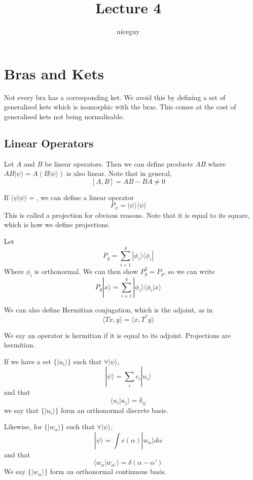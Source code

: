 \documentclass[12pt]{article}
\title{Lecture 4}
\author{niceguy}
\begin{document}
\maketitle

\section{Bras and Kets}

Not every bra has a corresponding ket. We avoid this by defining a set of generalised kets which is isomorphic with the bras. This comes at the cost of generalised kets not being normalisable.

\subsection{Linear Operators}

Let $A$ and $B$ be linear operators. Then we can define products $AB$ where $AB|\psi\rangle = A\left(B|\psi\rangle\right)$ is also linear. Note that in general,
$$[A,B] = AB - BA \neq 0$$

\begin{ex}
    If $\langle \psi | \psi \rangle =$, we can define a linear operator
    $$P_\psi = |\psi\rangle\langle\psi|$$
    This is called a projection for obvious reasons. Note that it is equal to its square, which is how we define projections.
\end{ex}

\begin{ex}
    Let
    $$P_g = \sum_{i=1}^g |\phi_i\rangle\langle\phi_i|$$
    Where $\phi_i$ is orthonormal. We can then show $P_g^2 = P_g$, so we can write
    $$P_g|x\rangle = \sum_{i=1}^g |\phi_i\rangle\langle\phi_i|x\rangle$$
\end{ex}

We can also define Hermitian conjugation, which is the adjoint, as in
$$\langle Tx,y \rangle = \langle x,T^*y \rangle$$

We say an operator is hermitian if it is equal to its adjoint. Projections are hermitian.

\begin{defn}
    If we have a set $\{|u_i\rangle\}$ such that $\forall |\psi\rangle$,
    $$|\psi\rangle = \sum_i c_i |u_i\rangle$$
    and that
    $$\langle u_i|u_j \rangle = \delta_{ij}$$
    we say that $\{|u_i\rangle\}$ form an orthonormal discrete basis.
\end{defn}

\begin{defn}
    Likewise, for $\{|w_\alpha\rangle\}$ such that $\forall |\psi\rangle$,
    $$|\psi\rangle = \int c(\alpha) |w_\alpha\rangle d\alpha$$
    and that
    $$\langle w_\alpha|w_{\alpha'}\rangle = \delta(\alpha - \alpha')$$
    We say $\{|w_\alpha\rangle\}$ form an orthonormal continuous basis.
\end{defn}
\end{document}
